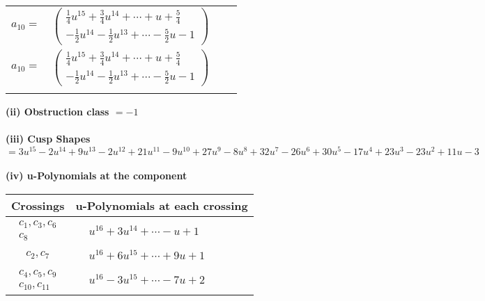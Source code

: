\documentclass[1p]{elsarticle_modified}
\theoremstyle{definition}
\begin{document}
\begin{tabular}{m{7pt} m{180pt} m{7pt} m{180pt} }
\flushright $a_{10}=$&$\begin{pmatrix}\frac{1}{4} u^{15}+\frac{3}{4} u^{14}+\cdots+u+\frac{5}{4}\\-\frac{1}{2} u^{14}-\frac{1}{2} u^{13}+\cdots-\frac{5}{2} u-1\end{pmatrix}$\\ \flushright $a_{10}=$&$\begin{pmatrix}\frac{1}{4} u^{15}+\frac{3}{4} u^{14}+\cdots+u+\frac{5}{4}\\-\frac{1}{2} u^{14}-\frac{1}{2} u^{13}+\cdots-\frac{5}{2} u-1\end{pmatrix}$\\&\end{tabular}
\flushleft \textbf{(ii) Obstruction class $= -1$}\\~\\
\flushleft \textbf{(iii) Cusp Shapes $= 3 u^{15}-2 u^{14}+9 u^{13}-2 u^{12}+21 u^{11}-9 u^{10}+27 u^9-8 u^8+32 u^7-26 u^6+30 u^5-17 u^4+23 u^3-23 u^2+11 u-3$}\\~\\
\newpage\renewcommand{\arraystretch}{1}
\flushleft \textbf{(iv) u-Polynomials at the component}\newline \\
\begin{tabular}{m{50pt}|m{274pt}}
Crossings & \hspace{64pt}u-Polynomials at each crossing \\
\hline $$\begin{aligned}c_{1},c_{3},c_{6}\\c_{8}\end{aligned}$$&$\begin{aligned}
&u^{16}+3 u^{14}+\cdots- u+1
\end{aligned}$\\
\hline $$\begin{aligned}c_{2},c_{7}\end{aligned}$$&$\begin{aligned}
&u^{16}+6 u^{15}+\cdots+9 u+1
\end{aligned}$\\
\hline $$\begin{aligned}c_{4},c_{5},c_{9}\\c_{10},c_{11}\end{aligned}$$&$\begin{aligned}
&u^{16}-3 u^{15}+\cdots-7 u+2
\end{aligned}$\\
\hline
\end{tabular}\\~\\
\end{document}
